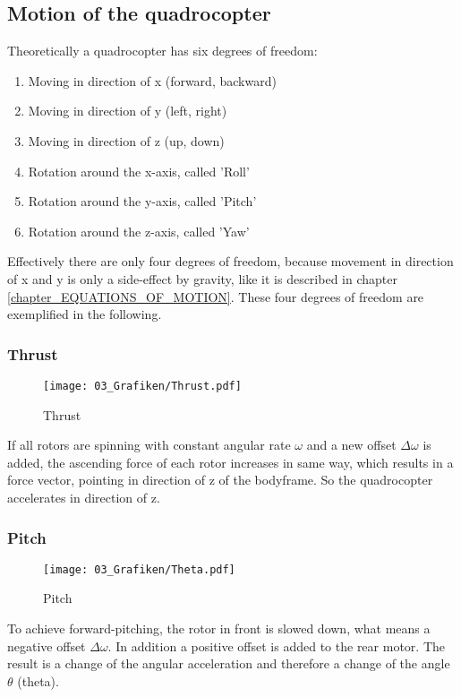 \subsection{Motion of the quadrocopter}\label{chapter_BASICS}

Theoretically a quadrocopter has six degrees of freedom: 
\begin{enumerate}
		\item Moving in direction of x (forward, backward)
		\item Moving in direction of y (left, right)
		\item Moving in direction of z (up, down)
		\item Rotation around the x-axis, called 'Roll'
		\item Rotation around the y-axis, called 'Pitch'
		\item Rotation around the z-axis, called 'Yaw'
\end{enumerate}
Effectively there are only four degrees of freedom, because movement in direction of x and y is only a side-effect by gravity, like it is described in chapter \ref{chapter_EQUATIONS_OF_MOTION}. 
These four degrees of freedom are exemplified in the following.

\subsubsection{Thrust}
\begin{figure}[htbp]
	\centering
		\texttt{[image: 03\_Grafiken/Thrust.pdf]}
	\caption{Thrust}
	\label{fig:Thrust}
\end{figure}

If all rotors are spinning with constant angular rate $\omega$ and a new offset $\Delta\omega$ is added, the ascending force of each rotor increases in same way, which results in a force vector, pointing in direction of z of the bodyframe. So the quadrocopter accelerates in direction of z.

\subsubsection{Pitch}
\begin{figure}[H]
	\centering
		\texttt{[image: 03\_Grafiken/Theta.pdf]}
	\caption{Pitch}
	\label{fig:Theta}
\end{figure}
To achieve forward-pitching, the rotor in front is slowed down, what means a negative offset $\Delta\omega$. In addition a positive offset is added to the rear motor. The result is a change of the angular acceleration and therefore a change of the angle $\theta$ (theta).

